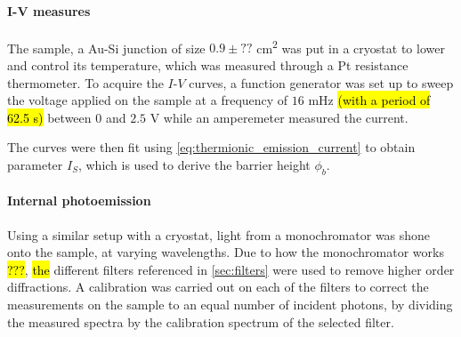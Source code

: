 \paragraph{I-V measures}
The sample, a Au-Si junction of size $0.9 \pm ??$ \unit{\cm\squared} was put in a cryostat to lower and control its temperature, which was measured through a Pt resistance thermometer.
To acquire the $I$-$V$ curves, a function generator was set up to sweep the voltage applied on the sample at a frequency of $16$ mHz \hl{(with a period of 62.5 s)} between $0$ and $2.5$ V while an amperemeter measured the current. 

The curves were then fit using \autoref{eq:thermionic_emission_current} to obtain parameter $I_S$, which is used to derive the barrier height $\phi_b$.

\paragraph{Internal photoemission}
Using a similar setup with a cryostat, light from a monochromator was shone onto the sample, at varying wavelengths. Due to how the monochromator works \hl{???}, \hl{the} different filters referenced in \autoref{sec:filters} were used to remove higher order diffractions. A calibration was carried out on each of the filters to correct the measurements on the sample to an equal number of incident photons, by dividing the measured spectra by the calibration spectrum of the selected filter.

